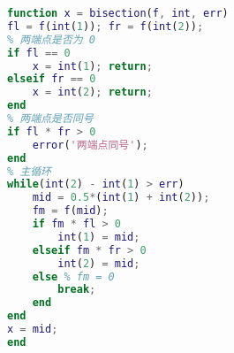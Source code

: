 \begin{lstlisting}[language=Matlab]
% 二分法求函数的根
function x = bisection(f, int, err)
fl = f(int(1)); fr = f(int(2));
% 两端点是否为 0
if fl == 0
    x = int(1); return;
elseif fr == 0
    x = int(2); return;
end
% 两端点是否同号
if fl * fr > 0
    error('两端点同号');
end
% 主循环
while(int(2) - int(1) > err)
    mid = 0.5*(int(1) + int(2));
    fm = f(mid);
    if fm * fl > 0
        int(1) = mid;
    elseif fm * fr > 0
        int(2) = mid;
    else % fm = 0
        break;
    end
end
x = mid;
end
\end{lstlisting}